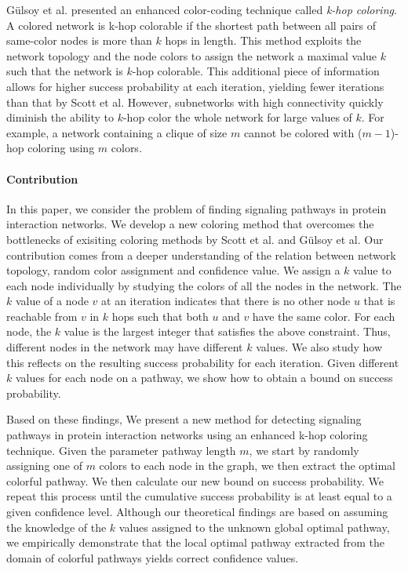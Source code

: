 \documentclass{ws-procs11x85}
\begin{document}
G{\"u}lsoy et al.\cite{gulsoy} presented an enhanced color-coding technique
called \textit{k-hop coloring}. A colored network is k-hop colorable if the
shortest path between all pairs of same-color nodes is more than $k$ hops in
length. This method exploits the network topology and the node colors to assign
the network a maximal value $k$ such that the network is $k$-hop colorable.
This additional piece of information allows for higher success probability at
each iteration, yielding fewer iterations than that by Scott et al. However,
subnetworks with high connectivity quickly diminish the ability to $k$-hop
color the whole network for large values of $k$. For example, a network
containing a clique of size $m$ cannot be colored with ($m-1$)-hop coloring
using $m$ colors\cite{gulsoy}.

\paragraph{Contribution} In this paper, we consider the problem of finding
signaling pathways in protein interaction networks. We develop a new coloring
method that overcomes the bottlenecks of exisiting coloring methods by Scott et
al.\cite{scott} and G{\"u}lsoy et al\cite{gulsoy}. Our contribution comes from a
deeper understanding of the relation between network topology, random color
assignment and confidence value. We assign a $k$ value to each node
individually by studying the colors of all the nodes in the network. The $k$
value of a node $v$ at an iteration indicates that there is no other node $u$
that is reachable from $v$ in $k$ hops such that both $u$ and $v$ have the same
color. For each node, the $k$ value is the largest integer that satisfies the
above constraint. Thus, different nodes in the network may have different $k$
values. We also study how this reflects on the resulting success probability for
each iteration. Given different $k$ values for each node on a pathway, we show
how to obtain a bound on success probability.

Based on these findings, We present a new method for detecting signaling
pathways in protein interaction networks using an enhanced k-hop coloring
technique. Given the parameter pathway length $m$, we start by randomly
assigning one of $m$ colors to each node in the graph, we then extract the
optimal colorful pathway. We then calculate our new bound on success
probability. We repeat this process until the cumulative success probability is
at least equal to a given confidence level. Although our theoretical findings
are based on assuming the knowledge of the $k$ values assigned to the unknown
global optimal pathway, we empirically demonstrate that the local optimal
pathway extracted from the domain of colorful pathways yields correct
confidence values.
\end{document}
